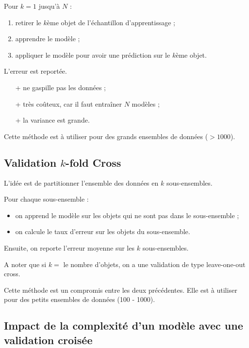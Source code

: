 \documentclass[10pt,a4paper]{report}
\begin{document}
		Pour $k = 1$ jusqu'à $N$ :
		
		\begin{enumerate}
			\item retirer le $k$ème objet de l'échantillon d'apprentissage ;
			\item apprendre le modèle ;
			\item appliquer le modèle pour avoir une prédiction sur le $k$ème objet.
		\end{enumerate}
		
		L'erreur est reportée.
		
		\begin{itemize}
			\item[+] ne gaspille pas les données ;
			\item[+] très coûteux, car il faut entraîner $N$ modèles ;
			\item[+] la variance est grande.
		\end{itemize}
		
		Cette méthode est à utiliser pour des grands ensembles de données ($> 1000$).
		
		\subsection{Validation $k$-fold Cross}
		
		L'idée est de partitionner l'ensemble des données en $k$ sous-ensembles.
		
		Pour chaque sous-ensemble :
		
		\begin{itemize}
			\item on apprend le modèle sur les objets qui ne sont pas dans le sous-ensemble ;
			\item on calcule le taux d'erreur sur les objets du sous-ensemble.
		\end{itemize}
		
		Ensuite, on reporte l'erreur moyenne sur les $k$ sous-ensembles.
		
		A noter que si $k = $ le nombre d'objets, on a une validation de type leave-one-out cross.
		
		Cette méthode est un compromis entre les deux précédentes. Elle est à utiliser pour des petits ensembles de données (100 - 1000).
		
		\subsection{Impact de la complexité d'un modèle avec une validation croisée}
		
\end{document}
